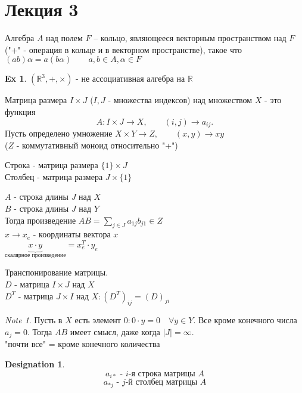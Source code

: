 \documentclass[11pt]{book}
\newcommand{\R}{\mathbb{R}}
\theoremstyle{definition}
\theoremstyle{plain}
\theoremstyle{plain}
\theoremstyle{definition}
\newtheorem*{ex}{Ex}
\newtheorem*{name}{Designation}
\theoremstyle{remark}
\newtheorem*{note}{Note}
\begin{document}
\section{Лекция 3}
\begin{defn}
    Алгебра $A$ над полем $F$ -- кольцо, являющееся векторным пространством над $F$ ("+" - операция в кольце и в векторном пространстве), такое что $(ab)\alpha = a(b\alpha) \qquad a, b \in A, \alpha \in F$
\end{defn}
\begin{ex}
    $(\R^3, +, \times)$ - не ассоциативная алгебра на $\R$
\end{ex}
\begin{defn}
    Матрица размера $I\times J$ ($I, J$ - множества индексов) над множеством $X$ - это функция \[
	A: I\times J \to X ,\qquad (i,j) \to a_{ij}
    .\] 
    Пусть определено умножение $X \times Y \to Z, \qquad  (x, y) \to xy$ \\($Z$ - коммутативный моноид относительно "+")
\end{defn}
\begin{defn}
    Строка - матрица размера $\{1\}\times J$\\
    Столбец - матрица размера $J \times \{1\}$
\end{defn}
\noindent$A$ - строка длины $J$ над $X$\\
$B$ - строка длины $J$ над $Y$\\
Тогда произведение $AB = \sum\limits_{j \in J} a_{1j} b_{j1} \in Z$\\
$x \to x_e$ - координаты вектора $x$\\
$\underbrace{x\cdot y}_{\mbox{скалярное произведение}} = x_e^T \cdot y_e$
\begin{defn}
    Транспонирование матрицы.\\
    $D$ - матрица $I \times J$ над $X$\\
    $D^T$ - матрица $J \times I$ над $X: (D^T)_{ij} = (D)_{ji}$
\end{defn}
\begin{note}
    Пусть в $X$ есть элемент $0 : 0\cdot y = 0 \quad \forall y \in Y$. Все кроме конечного числа $a_j = 0$. Тогда $AB$ имеет смысл, даже когда $|J| = \infty$.\\
    "почти все" = кроме конечного количества\\
\end{note}
\begin{name}
    $$a_{i*} \mbox{ - $i$-я строка матрицы }A$$
    $$a_{*j} \mbox{ - $j$-й столбец матрицы }A$$
\end{name}
\end{document}
